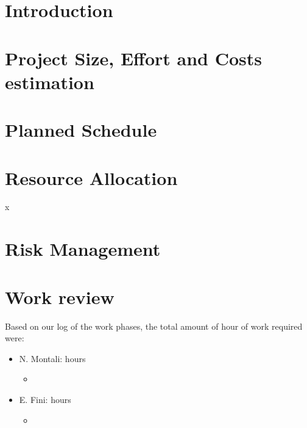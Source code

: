 \documentclass[a4paper,12pt,oneside]{book}
\begin{document}
	\begin{flushleft}
	\chapter{Introduction}\label{cap:Intro}
	
	\chapter{Project Size, Effort and Costs estimation}\label{cap:estimation}
	
	\chapter{Planned Schedule}\label{cap:schedule}
	
	\chapter{Resource Allocation}\label{cap:resource}
	x
	\chapter{Risk Management}\label{cap:risk}
	
	\chapter{Work review}
	Based on our log of the work phases, the total amount of hour of work required were:
	\begin{itemize}
	\item N. Montali: hours \begin{itemize}
		\item 
	\end{itemize}
	\item E. Fini: hours\begin{itemize}
		\item 
	\end{itemize}
	\end{itemize}
	\end{flushleft}
\end{document}
